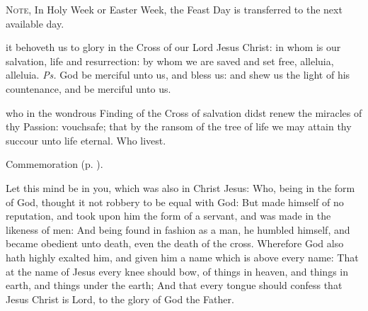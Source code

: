\clearpage
{}

\begin{rubric}
	\textsc{Note,} In Holy Week or Easter Week, the Feast Day is transferred to the next available day.
\end{rubric}

\introit
{} it behoveth us to glory in the Cross of our Lord Jesus Christ: in whom is our salvation, life and resurrection: by whom we are saved and set free, alleluia, alleluia. \textit{Ps.} God be merciful unto us, and bless us: and shew us the light of his countenance, and be merciful unto us.

\collect
{} who in the wondrous Finding of the Cross of salvation didst renew the miracles of thy Passion: vouchsafe; that by the ransom of the tree of life we may attain thy succour unto life eternal. Who livest.
\begin{rubric}
	 Commemoration  (p. \pageref{AlexanderEtcCollect}).
\end{rubric}

 Let this mind be in you, which was also in Christ Jesus: Who, being in the form of God, thought it not robbery to be equal with God: But made himself of no reputation, and took upon him the form of a servant, and was made in the likeness of men: And being found in fashion as a man, he humbled himself, and became obedient unto death, even the death of the cross. Wherefore God also hath highly exalted him, and given him a name which is above every name: That at the name of Jesus every knee should bow, of things in heaven, and things in earth, and things under the earth; And that every tongue should confess that Jesus Christ is Lord, to the glory of God the Father.


